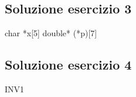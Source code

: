 \documentclass[12pt,oneside,a4paper]{article}
\begin{document}
\subsection{Soluzione esercizio 3}
char *x[5]\newline
double* (*p)[7]
\subsection{Soluzione esercizio 4}
INV1
\end{document}

